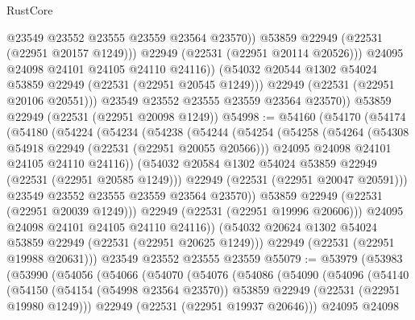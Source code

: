 \begin{lexlean}{RustCore}
\begin{coremodule}
                      @23549
                      @23552
                      @23555
                      @23559
                      @23564
                      @23570))
                  @53859
                  @22949
                  (@22531 (@22951 @20157 @1249)))
                @22949
                (@22531 (@22951 @20114 @20526)))
              @24095
              @24098
              @24101
              @24105
              @24110
              @24116))
          (@54032 @20544 @1302 @54024 @53859 @22949 (@22531 (@22951 @20545 @1249)))
          @22949
          (@22531 (@22951 @20106 @20551)))
        @23549
        @23552
        @23555
        @23559
        @23564
        @23570))
    @53859
    @22949
    (@22531 (@22951 @20098 @1249))
@54998 := @54160
    (@54170
      (@54174
        (@54180
          (@54224
            (@54234
              (@54238
                (@54244
                  (@54254
                    (@54258
                      (@54264
                        (@54308 @54918 @22949 (@22531 (@22951 @20055 @20566)))
                        @24095
                        @24098
                        @24101
                        @24105
                        @24110
                        @24116))
                    (@54032 @20584 @1302 @54024 @53859 @22949 (@22531 (@22951 @20585 @1249)))
                    @22949
                    (@22531 (@22951 @20047 @20591)))
                  @23549
                  @23552
                  @23555
                  @23559
                  @23564
                  @23570))
              @53859
              @22949
              (@22531 (@22951 @20039 @1249)))
            @22949
            (@22531 (@22951 @19996 @20606)))
          @24095
          @24098
          @24101
          @24105
          @24110
          @24116))
      (@54032 @20624 @1302 @54024 @53859 @22949 (@22531 (@22951 @20625 @1249)))
      @22949
      (@22531 (@22951 @19988 @20631)))
    @23549
    @23552
    @23555
    @23559
@55079 := @53979
    (@53983
      (@53990
        (@54056
          (@54066
            (@54070
              (@54076
                (@54086
                  (@54090
                    (@54096
                      (@54140
                        (@54150
                          (@54154 (@54998 @23564 @23570))
                          @53859
                          @22949
                          (@22531 (@22951 @19980 @1249)))
                        @22949
                        (@22531 (@22951 @19937 @20646)))
                      @24095
                      @24098

\end{coremodule}
\end{lexlean}
